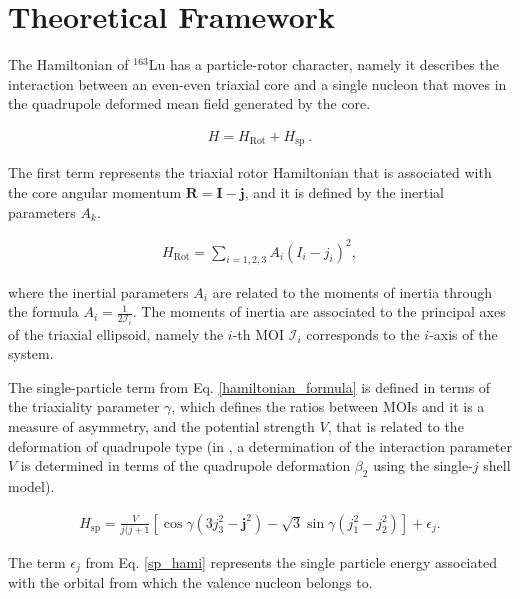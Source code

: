 \documentclass[%
 reprint,
 amsmath,
 amssymb,
 aps,
]{revtex4-2}
\begin{document}
\section{Theoretical Framework}

The Hamiltonian of $^{163}$Lu has a particle-rotor character, namely it describes the interaction between an even-even triaxial core and a single nucleon that moves in the quadrupole deformed mean field generated by the core.

\begin{align}
    H=H_\text{Rot}+H_\text{sp}\ . \label{hamiltonian_formula}
\end{align}

The first term represents the triaxial rotor Hamiltonian that is associated with the core angular momentum $\mathbf{R}=\mathbf{I}-\mathbf{j}$, and it is defined by the inertial parameters $A_k$.

\begin{align}
    H_\text{Rot}=\sum_{i=1,2,3}A_i\left(I_i-j_i\right)^2,
\end{align}
 
 where the inertial parameters $A_i$ are related to the moments of inertia through the formula $A_i=\frac{1}{2\mathcal{I}_i}$. The moments of inertia are associated to the principal axes of the triaxial ellipsoid, namely the $i$-th MOI $\mathcal{I}_i$ corresponds to the $i$-axis of the system.

The single-particle term from Eq. \ref{hamiltonian_formula} is defined in terms of the triaxiality parameter $\gamma$, which defines the ratios between MOIs and it is a measure of asymmetry, and the potential strength $V$, that is related to the deformation of quadrupole type (in \cite{shou2009coupling}, a determination of the interaction parameter $V$ is determined in terms of the quadrupole deformation $\beta_2$ using the single-$j$ shell model).

\begin{align}
    H_\text{sp} = \frac{V}{j(j+1}\left[\cos\gamma\left(3j_3^2-\mathbf{j}^2\right)-\sqrt{3}\sin\gamma\left(j_1^2-j_2^2\right)\right]+\epsilon_j. \label{sp_hami}
\end{align}

The term $\epsilon_j$ from Eq. \ref{sp_hami} represents the single particle energy associated with the orbital from which the valence nucleon belongs to.
\end{document}

